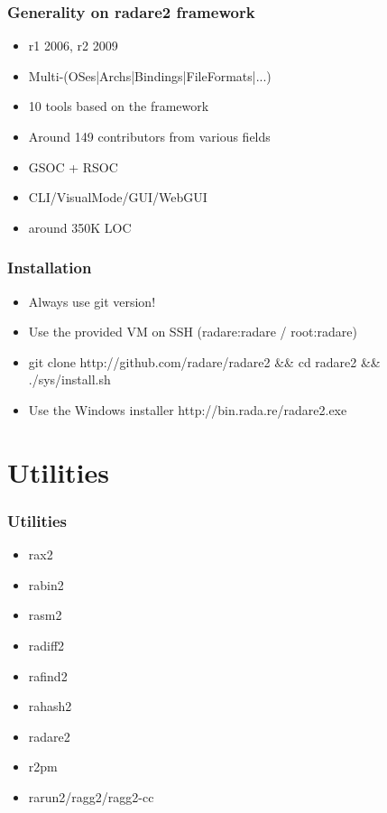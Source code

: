 \documentclass[10pt,pdf,utf8,english,compress,hyperref={unicode}]{beamer}
\begin{document}
\begin{frame}[fragile]
  \frametitle{Generality on radare2 framework}
  \begin{itemize}
  \item r1 2006, r2 2009
  \item Multi-(OSes|Archs|Bindings|FileFormats|...)
  \item 10 tools based on the framework
  \item Around 149 contributors from various fields
  \item GSOC + RSOC
  \item CLI/VisualMode/GUI/WebGUI
  \item around 350K LOC
  \end{itemize}
\end{frame}


\begin{frame}[fragile]
  \frametitle{Installation}
  \begin{itemize}
  \item Always use git version!
  \item Use the provided VM on SSH (\alert{radare:radare} / \alert{root:radare})
  \item git clone \alert{http://github.com/radare/radare2 \&\& cd radare2 \&\& ./sys/install.sh}
  \item Use the Windows installer \alert{http://bin.rada.re/radare2.exe}
  \end{itemize}
\end{frame}

\section{Utilities}

\begin{frame}[fragile]
  \frametitle{Utilities}
     \begin{itemize}
        \item rax2
        \item rabin2
        \item rasm2
        \item radiff2
        \item rafind2
        \item rahash2
        \item radare2
        \item r2pm
        \item rarun2/ragg2/ragg2-cc
      \end{itemize}
\end{frame}
\end{document}
